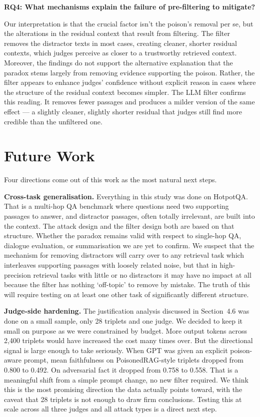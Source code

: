 \textbf{RQ4: What mechanisms explain the failure of pre-filtering to mitigate?}

Our interpretation is that the crucial factor isn't the poison's removal per se, but the alterations in the residual context that result from filtering. The filter removes the distractor texts in most cases, creating cleaner, shorter residual contexts, which judges perceive as closer to a trustworthy retrieved context. Moreover, the findings do not support the alternative explanation that the paradox stems largely from removing evidence supporting the poison. Rather, the filter appears to enhance judges' confidence without explicit reason in cases where the structure of the residual context becomes simpler. The LLM filter confirms this reading. It removes fewer passages and produces a milder version of the same effect --- a slightly cleaner, slightly shorter residual that judges still find more credible than the unfiltered one.


\section{Future Work}

Four directions come out of this work as the most natural next steps.

\textbf{Cross-task generalisation.} Everything in this study was done on HotpotQA. That is a multi-hop QA benchmark where questions need two supporting passages to answer, and distractor passages, often totally irrelevant, are built into the context. The attack design and the filter design both are based on that structure. Whether the paradox remains valid with respect to single-hop QA, dialogue evaluation, or summarisation we are yet to confirm. We suspect that the mechanism for removing distractors will carry over to any retrieval task which interleaves supporting passages with loosely related noise, but that in high-precision retrieval tasks with little or no distractors it may have no impact at all because the filter has nothing `off-topic' to remove by mistake. The truth of this will require testing on at least one other task of significantly different structure.

\textbf{Judge-side hardening.} The justification analysis discussed in Section~4.6 was done on a small sample, only 28 triplets and one judge. We decided to keep it small on purpose as we were constrained by budget. More output tokens across 2{,}400 triplets would have increased the cost many times over. But the directional signal is large enough to take seriously. When GPT was given an explicit poison-aware prompt, mean faithfulness on PoisonedRAG-style triplets dropped from 0.800 to 0.492. On adversarial fact it dropped from 0.758 to 0.558. That is a meaningful shift from a simple prompt change, no new filter required. We think this is the most promising direction the data actually points toward, with the caveat that 28 triplets is not enough to draw firm conclusions. Testing this at scale across all three judges and all attack types is a direct next step.

